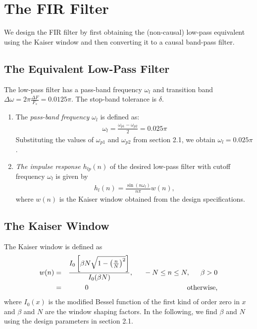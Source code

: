 \documentclass{article}
\begin{document}
\section{The FIR Filter}
We design the FIR filter by first obtaining the (non-causal) low-pass equivalent using the Kaiser window
and then
converting it to a causal band-pass filter.

\subsection{The Equivalent Low-Pass Filter}
The low-pass filter has a pass-band frequency $\omega_l$ and transition band $\Delta \omega = 2\pi \frac{\Delta F}{F_s} = 0.0125\pi$.
The stop-band tolerance is $\delta$.
\begin{enumerate}
\item  The {\em pass-band frequency $\omega_l$}  is defined as:
\begin{align}
    \omega_l = \frac{\omega_{p1} - \omega_{p2}}{2} = 0.025\pi
\end{align}
Substituting the values of $\omega_{p1}$ and $\omega_{p2}$ from section 2.1, we obtain $\omega_l = 0.025\pi$.

\item {\em The impulse response $h_{lp}(n)$} of the desired low-pass filter with cutoff frequency $\omega_l$
is given by
\begin{eqnarray}
\label{firlpdef}
h_l(n) = \frac{\sin(n\omega_l)}{n\pi}w(n),
\end{eqnarray}
where $w(n)$ is the Kaiser window obtained from the design specifications.
\end{enumerate}

\subsection{The Kaiser Window}
The Kaiser window is defined as
\begin{eqnarray}
\label{kaiser}
w(n) &=& \frac{I_0\left[ \beta N \sqrt{1 - \left(\frac{n}{N}\right)^2} \right]}{I_0(\beta N)},
\indent -N \leq n \leq N, \indent \beta > 0 \nonumber \\
&=& 0 \hspace{5cm} \mbox{otherwise,}
\end{eqnarray}
where $I_0(x)$ is the modified Bessel function of the first kind of order zero in $x$ and $\beta$
and $N$ are the window shaping factors.  In the following,
we find $\beta$ and $N$ using the design parameters in section 2.1.
\end{document}
